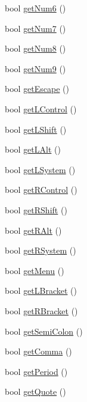 \begin{DoxyCompactItemize}
bool \hyperlink{class_update_data_ad27b6d6989ce78c50ea48f328193d119}{get\-Num6} ()
\item 
bool \hyperlink{class_update_data_a2c9158bfbe33563923a6d3bf5190fe6c}{get\-Num7} ()
\item 
bool \hyperlink{class_update_data_abc71c60234efc31e0e04d06d95315a8a}{get\-Num8} ()
\item 
bool \hyperlink{class_update_data_aee826ac50dcd4001c61f45b9000fdc6e}{get\-Num9} ()
\item 
bool \hyperlink{class_update_data_a846ba5bb9e86e12d4fb22845c9d5d705}{get\-Escape} ()
\item 
bool \hyperlink{class_update_data_a879796f82489375ed0a31572590d336a}{get\-L\-Control} ()
\item 
bool \hyperlink{class_update_data_a85b0cd07aa88eaaecb740093f83e70ba}{get\-L\-Shift} ()
\item 
bool \hyperlink{class_update_data_abaf514ad59bc732b25daa0561c32100e}{get\-L\-Alt} ()
\item 
bool \hyperlink{class_update_data_a38abae989d111f2c2c16f218fd9aad00}{get\-L\-System} ()
\item 
bool \hyperlink{class_update_data_a2984709c90638dec19ee40430f2154fb}{get\-R\-Control} ()
\item 
bool \hyperlink{class_update_data_a5d78d41fb8f4c3cf96fc9023c92b7f82}{get\-R\-Shift} ()
\item 
bool \hyperlink{class_update_data_aec55065be384063726e953c84da37308}{get\-R\-Alt} ()
\item 
bool \hyperlink{class_update_data_a6b22f943435ce5668f32e3b0e7474081}{get\-R\-System} ()
\item 
bool \hyperlink{class_update_data_a719ab2ae19f40061e5c46847708b0113}{get\-Menu} ()
\item 
bool \hyperlink{class_update_data_adaff4ef7db2f70afee4a0a1f6f5989fc}{get\-L\-Bracket} ()
\item 
bool \hyperlink{class_update_data_ae92d919c105c3672282b274dec47b31b}{get\-R\-Bracket} ()
\item 
bool \hyperlink{class_update_data_afeaa06e003e7f855db41443572c2697c}{get\-Semi\-Colon} ()
\item 
bool \hyperlink{class_update_data_a95690d070423256a8fac9f1c39395af3}{get\-Comma} ()
\item 
bool \hyperlink{class_update_data_aaf034236d4a5ab0e669a28bcf2c34a70}{get\-Period} ()
\item 
bool \hyperlink{class_update_data_af4b426f024a3879c55c8ede49f62794a}{get\-Quote} ()

\end{DoxyCompactItemize}
